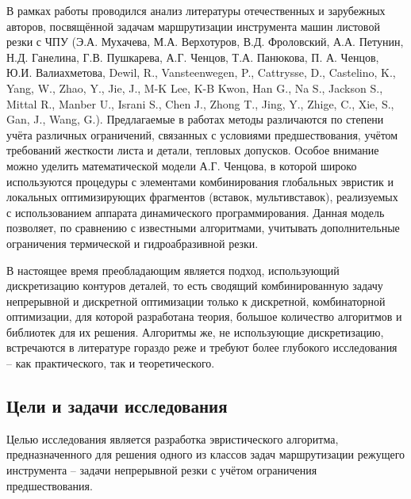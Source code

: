\documentclass[14pt]{extarticle}
\theoremstyle{plain}%
\theoremstyle{remark}
\begin{document}
В рамках работы проводился анализ литературы отечественных и
зарубежных авторов,
посвящённой задачам маршрутизации инструмента машин
листовой резки с ЧПУ
(Э.А. Мухачева, М.А. Верхотуров, В.Д. Фроловский, А.А.
Петунин, Н.Д. Ганелина, Г.В. Пушкарева, А.Г. Ченцов, Т.А. Панюкова, П. А.
Ченцов, Ю.И. Валиахметова,
Dewil, R., Vansteenwegen, P., Cattrysse, D.,
Castelino, K.,
Yang, W., Zhao, Y., Jie, J., M-K Lee, K-B Kwon, Han G.,
Na S., Jackson S., Mittal R., Manber U., Israni S., Chen J., Zhong T., Jing, Y.,
Zhige, C., Xie, S., Gan, J., Wang, G.).
Предлагаемые в работах методы
различаются по степени учёта различных ограничений, связанных с условиями
предшествования,
учётом требований жесткости листа и детали, тепловых
допусков.
Особое внимание можно уделить математической модели А.Г. Ченцова,
в которой широко используются процедуры с элементами комбинирования
глобальных эвристик и локальных оптимизирующих фрагментов (вставок,
мультивставок),
реализуемых с использованием
аппарата динамического программирования.
Данная модель позволяет, по сравнению с известными
алгоритмами, учитывать дополнительные ограничения термической
и гидроабразивной резки.

В настоящее время преобладающим является подход,
использующий дискретизацию контуров деталей,
то есть сводящий комбинированную задачу
непрерывной и дискретной оптимизации
только к дискретной,
комбинаторной оптимизации,
для которой разработана теория,
большое количество алгоритмов
и библиотек для их решения.
Алгоритмы же,
не использующие дискретизацию,
встречаются в литературе
гораздо реже
и требуют более глубокого исследования --
как практического,
так и теоретического.

\subsection*{Цели и задачи исследования}

Целью исследования является разработка
эвристического алгоритма,
предназначенного для решения
одного из классов задач маршрутизации
режущего инструмента --
задачи непрерывной резки
с учётом ограничения предшествования.
\end{document}
